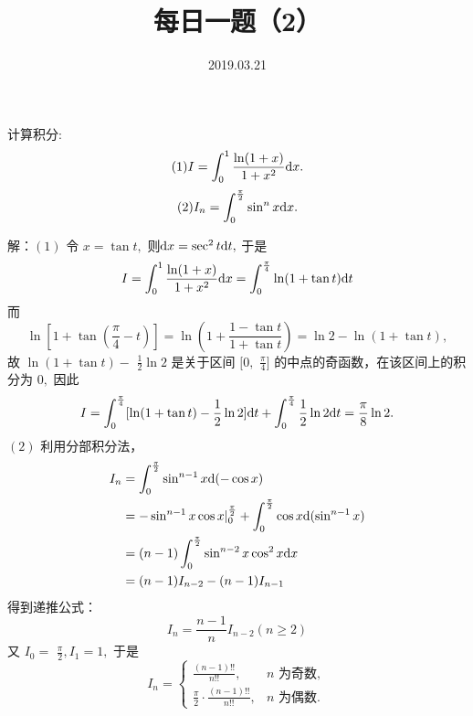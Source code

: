 \documentclass[UTF8]{ctexart}
\title{\textbf{每日一题（2）}}
\date{2019.03.21}
\begin{document}
\maketitle
计算积分: \[ (1) I = \int_{0}^{1} \frac{\ln(1+x)}{1+x^2}{\rm d} x .\]
\[ (2) I_n = \int_{0}^{\frac{\pi}{2}} \sin^n x {\rm d}x. \]

解：$(1)$ 令 $x=\tan t,$ 则${\rm d}x=\sec^2t{\rm d}t,$ 于是
\[
I=\int_{0}^{1}\frac{\ln(1+x)}{1+x^2}{\rm d} x = \int_{0}^{\frac{\pi}{4}}\ln(1+\tan t ){\rm d}t
\]
而 \[
\ln[1+\tan(\frac{\pi}{4}-t)]=\ln(1+\frac{1-\tan t}{1+\tan t})=\ln2 - \ln(1+\tan t),
\]
故 $\ln(1+\tan t)-$ $\displaystyle \frac{1}{2}\ln 2$ 是关于区间 $[0,$ $\displaystyle \frac{\pi}{4}]$ 的中点的奇函数，在该区间上的积分为 $0,$ 因此
\[
I=\int_{0}^{\frac{\pi}{4}}[\ln(1+\tan t)-\frac{1}{2}\ln 2]{\rm d}t+\int_{0}^{\frac{\pi}{4}}\frac{1}{2}\ln 2{\rm d}t=\frac{\pi}{8}\ln 2.
\]
$(2)$ 利用分部积分法，
\begin{align*}
  I_n &=\int_{0}^{\frac{\pi}{2}}\sin^{n-1}x{\rm d}(-\cos x) \\
    &=-\sin^{n-1}x\cos x |_{0}^{\frac{\pi}{2}}+\int_{0}^{\frac{\pi}{2}}\cos x{\rm d}(\sin^{n-1}x) \\
    &=(n-1)\int_{0}^{\frac{\pi}{2}}\sin^{n-2}x\cos^2 x{\rm d}x \\
    &=(n-1)I_{n-2}-(n-1)I_{n-1}
\end{align*}
得到递推公式：
\[
I_n=\frac{n-1}{n}I_{n-2}(n \geq 2)
\]
又 $I_0=$ $\displaystyle \frac{\pi}{2},I_1=1,$ 于是
\[I_n=
\begin{cases}
  \displaystyle \frac{(n-1)!!}{n!!}, & \mbox{$n$ 为奇数},  \\
  \displaystyle \frac{\pi}{2} \cdot \frac{(n-1)!!}{n!!}, & \mbox{$n$ 为偶数}.
\end{cases}
\]
\end{document}
